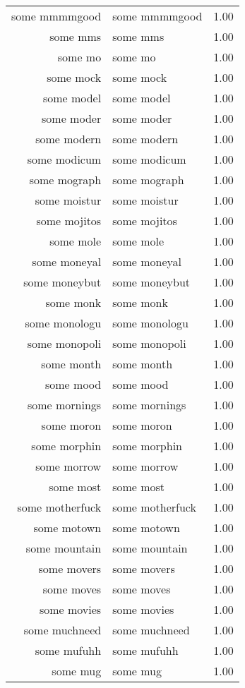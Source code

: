 \begin{table}[ht]
\begin{tabular}{rlr}
  some mmmmgood & some mmmmgood & 1.00 \\ 
  some mms & some mms & 1.00 \\ 
  some mo & some mo & 1.00 \\ 
  some mock & some mock & 1.00 \\ 
  some model & some model & 1.00 \\ 
  some moder & some moder & 1.00 \\ 
  some modern & some modern & 1.00 \\ 
  some modicum & some modicum & 1.00 \\ 
  some mograph & some mograph & 1.00 \\ 
  some moistur & some moistur & 1.00 \\ 
  some mojitos & some mojitos & 1.00 \\ 
  some mole & some mole & 1.00 \\ 
  some moneyal & some moneyal & 1.00 \\ 
  some moneybut & some moneybut & 1.00 \\ 
  some monk & some monk & 1.00 \\ 
  some monologu & some monologu & 1.00 \\ 
  some monopoli & some monopoli & 1.00 \\ 
  some month & some month & 1.00 \\ 
  some mood & some mood & 1.00 \\ 
  some mornings & some mornings & 1.00 \\ 
  some moron & some moron & 1.00 \\ 
  some morphin & some morphin & 1.00 \\ 
  some morrow & some morrow & 1.00 \\ 
  some most & some most & 1.00 \\ 
  some motherfuck & some motherfuck & 1.00 \\ 
  some motown & some motown & 1.00 \\ 
  some mountain & some mountain & 1.00 \\ 
  some movers & some movers & 1.00 \\ 
  some moves & some moves & 1.00 \\ 
  some movies & some movies & 1.00 \\ 
  some muchneed & some muchneed & 1.00 \\ 
  some mufuhh & some mufuhh & 1.00 \\ 
  some mug & some mug & 1.00 \\ 

\end{tabular}
\end{table}
